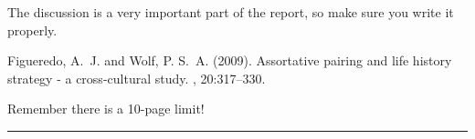 \documentclass[twoside,twocolumn,10pt]{article}
\begin{document}
The discussion is a very important part of the report, so make sure you write it properly.\cite{Figueredo:2009dg} 


\begin{thebibliography}{99} %

Figueredo, A.~J. and Wolf, P. S.~A. (2009).
\newblock Assortative pairing and life history strategy - a cross-cultural
  study.
, 20:317--330.
 
\end{thebibliography}



\Large{Remember there is a 10-page limit!}
\hrule 


\newpage
\appendix
\end{document}
